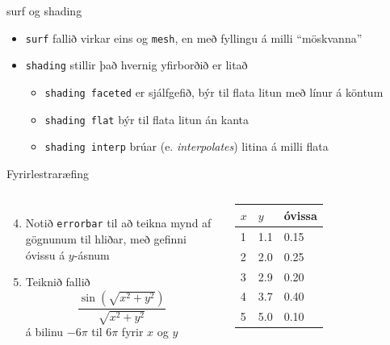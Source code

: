 \documentclass{beamer}
\begin{document}
\begin{frame}{surf og shading}
\begin{itemize}
 \item \texttt{surf} fallið virkar eins og \texttt{mesh}, en með fyllingu á milli ``möskvanna''
 \item \texttt{shading} stillir það hvernig yfirborðið er litað
 \begin{itemize}
  \item \texttt{shading faceted} er sjálfgefið, býr til flata litun með línur á köntum
  \item \texttt{shading flat} býr til flata litun án kanta
  \item \texttt{shading interp} brúar (e. \emph{interpolates}) litina á milli flata
 \end{itemize}
\end{itemize}
\end{frame}

\begin{frame}{Fyrirlestraræfing}
\begin{columns}
\begin{enumerate}
 \setcounter{enumi}{3}
 \item Notið \texttt{errorbar} til að teikna mynd af gögnunum til hliðar, með gefinni óvissu á $y$-ásnum
 \item Teiknið fallið
 \[
 \frac{\sin(\sqrt{x^2 + y^2})}{\sqrt{x^2 + y^2}}
 \]
 á bilinu $-6\pi$ til $6\pi$ fyrir $x$ og $y$
\end{enumerate}
\begin{tabular}{lll}
\toprule
$x$&$y$&óvissa\\
\midrule
1&1.1&0.15\\
2&2.0&0.25\\
3&2.9&0.20\\
4&3.7&0.40\\
5&5.0&0.10\\
\bottomrule
\end{tabular}
\end{columns}
\end{frame}
\end{document}
